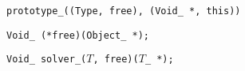 
\tt{prototype_((Type, free), (Void_ *, this))}


\tt{Void_ (*free)(Object_ *);}


\tt{Void_ solver_(}$T$\tt{, free)(}$T$\tt{_ *);}
